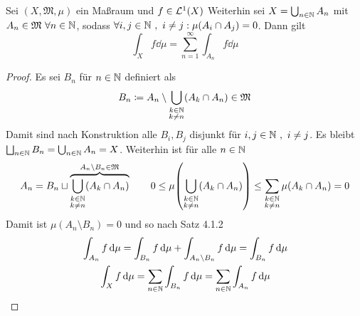 \documentclass{anablatt}
\begin{document}
\makeheader
\begin{theorem}
Sei $(X, \mathfrak M, \mu)$ ein Maßraum und $f \in \mathcal{L}^1(X)$ Weiterhin sei $X = \bigcup_{n\in\mathbb{N}}A_n$ mit $A_n \in \mathfrak M~\forall n \in \mathbb{N}$, sodass $\forall i,j \in \mathbb{N} ~,~ i\neq j : \mu(A_i\cap A_j) = 0$. Dann gilt
\[ \int_X f\dd\mu = \sum_{n=1}^\infty\int_{A_n} f\dd\mu \]
\end{theorem}
\begin{proof}
Es sei $B_n$ für $n \in \mathbb{N}$ definiert als
\[ B_n \coloneqq A_n \setminus \bigcup_{\substack{k\in\mathbb{N}\\ k\neq n}} (A_k \cap A_n) \in \mathfrak M \]
Damit sind nach Konstruktion alle $B_i, B_j$ disjunkt für $i,j \in \mathbb{N} ~,~ i\neq j$. Es bleibt $\bigsqcup_{n\in\mathbb{N}}B_n = \bigcup_{n\in\mathbb{N}}A_n = X$. Weiterhin ist für alle $n \in \mathbb{N}$
\[ A_n = B_n \sqcup \overbrace{\bigcup_{\substack{k\in\mathbb{N}\\ k\neq n}} (A_k \cap A_n)}^{A_n\setminus B_n \in \mathfrak M} \qquad
    0 \leq \mu\qty(\bigcup_{\substack{k\in\mathbb{N}\\ k\neq n}} (A_k \cap A_n)) \leq \sum_{\substack{k\in\mathbb{N}\\ k\neq n}} \mu(A_k \cap A_n) = 0
\]
Damit ist $\mu(A_n\setminus B_n) = 0$ und so nach Satz 4.1.2
\begin{gather*}
   \int_{A_n}f\dd\mu = \int_{B_n}f\dd\mu + \int_{A_n\setminus B_n}f\dd\mu = \int_{B_n}f\dd\mu \\
   \int_X f\dd\mu = \sum_{n \in \N} \int_{B_n}f\dd\mu= \sum_{n \in \N} \int_{A_n}f\dd\mu
\end{gather*}
\end{proof}
\end{document}
